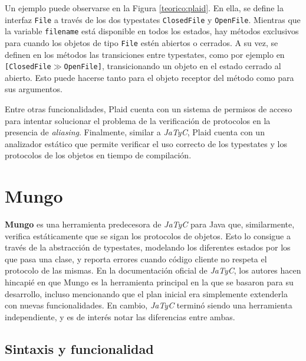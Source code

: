 Un ejemplo puede observarse en la Figura \ref{teorico:plaid}. En ella, se define la interfaz \texttt{File} a través de los dos typestates \texttt{ClosedFile} y \texttt{OpenFile}. Mientras que la variable \texttt{filename} está disponible en todos los estados, hay métodos exclusivos para cuando los objetos de tipo \texttt{File} estén abiertos o cerrados. A su vez, se definen en los métodos las transiciones entre typestates, como por ejemplo en \texttt{[ClosedFile$\gg$OpenFile]}, transicionando un objeto en el estado cerrado al abierto. Esto puede hacerse tanto para el objeto receptor del método como para sus argumentos.



Entre otras funcionalidades, Plaid cuenta con un sistema de permisos de acceso\cite{plaid:permissions} para intentar solucionar el problema de la verificación de protocolos en la presencia de \textit{aliasing}. Finalmente, similar a \textit{JaTyC}, Plaid cuenta con un analizador estático que permite verificar el uso correcto de los typestates y los protocolos de los objetos en tiempo de compilación.

\section{Mungo}

\textbf{Mungo}\cite{mungo:website} es una herramienta predecesora de \textit{JaTyC} para Java que, similarmente, verifica estáticamente que se sigan los protocolos de objetos. Esto lo consigue a través de la abstracción de typestates, modelando los diferentes estados por los que pasa una clase, y reporta errores cuando código cliente no respeta el protocolo de las mismas. En la documentación oficial de \textit{JaTyC}\cite{jatyc:documentation}\cite{jatyc:msc-thesis}, los autores hacen hincapié en que Mungo es la herramienta principal en la que se basaron para su desarrollo, incluso mencionando que el plan inicial era simplemente extenderla con nuevas funcionalidades. En cambio, \textit{JaTyC} terminó siendo una herramienta independiente, y es de interés notar las diferencias entre ambas\cite{jatyc:mungo-comparison}.

\subsection{Sintaxis y funcionalidad}

